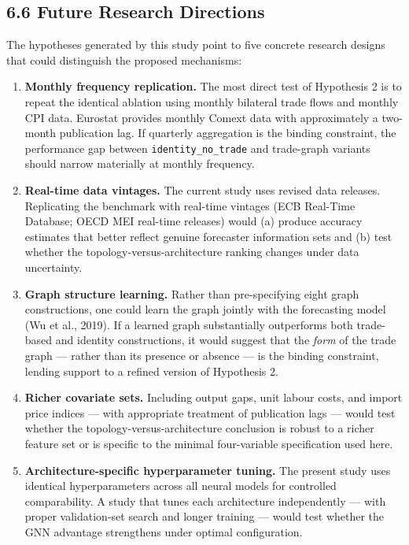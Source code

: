 \documentclass[
]{article}
\providecommand{\tightlist}{%
  \setlength{\itemsep}{0pt}\setlength{\parskip}{0pt}}
\begin{document}
\subsection{6.6 Future Research Directions}\label{future-research-directions}

The hypotheses generated by this study point to five concrete research designs that could distinguish the proposed mechanisms:

\begin{enumerate}
\def\labelenumi{\arabic{enumi}.}
\tightlist
\item
  \textbf{Monthly frequency replication.} The most direct test of Hypothesis 2 is to repeat the identical ablation using monthly bilateral trade flows and monthly CPI data. Eurostat provides monthly Comext data with approximately a two-month publication lag. If quarterly aggregation is the binding constraint, the performance gap between \texttt{identity\_no\_trade} and trade-graph variants should narrow materially at monthly frequency.
\item
  \textbf{Real-time data vintages.} The current study uses revised data releases. Replicating the benchmark with real-time vintages (ECB Real-Time Database; OECD MEI real-time releases) would (a) produce accuracy estimates that better reflect genuine forecaster information sets and (b) test whether the topology-versus-architecture ranking changes under data uncertainty.
\item
  \textbf{Graph structure learning.} Rather than pre-specifying eight graph constructions, one could learn the graph jointly with the forecasting model (Wu et al., 2019). If a learned graph substantially outperforms both trade-based and identity constructions, it would suggest that the \emph{form} of the trade graph --- rather than its presence or absence --- is the binding constraint, lending support to a refined version of Hypothesis 2.
\item
  \textbf{Richer covariate sets.} Including output gaps, unit labour costs, and import price indices — with appropriate treatment of publication lags — would test whether the topology-versus-architecture conclusion is robust to a richer feature set or is specific to the minimal four-variable specification used here.
\item
  \textbf{Architecture-specific hyperparameter tuning.} The present study uses identical hyperparameters across all neural models for controlled comparability. A study that tunes each architecture independently — with proper validation-set search and longer training — would test whether the GNN advantage strengthens under optimal configuration.
\end{enumerate}
\end{document}
